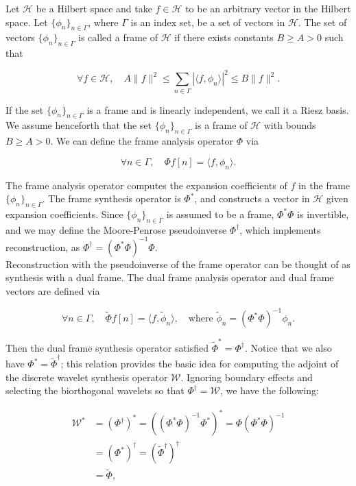 \documentclass[journal]{IEEEtran}
\begin{document}
Let $\mathcal{H}$ be a Hilbert space and take $f\in\mathcal{H}$ to be an arbitrary vector in the Hilbert space.  Let $\{\phi_n\}_{n\in\Gamma}$, where $\Gamma$ is an index set, be a set of vectors in $\mathcal{H}$.  The set of vectors $\{\phi_n\}_{n\in\Gamma}$ is called a frame of $\mathcal{H}$ if there exists constants $B\ge A > 0$ such that

\[ \forall f\in \mathcal{H}, \quad A\|f\|^2 \le \sum_{n\in\Gamma} |\langle f,\phi_n\rangle|^2\le B \|f\|^2. \] 

\noindent If the set $\{\phi_n\}_{n\in\Gamma}$ is a frame and is linearly independent, we call it a Riesz basis.\\

We assume henceforth that the set $\{\phi_n\}_{n\in\Gamma}$ is a frame of $\mathcal{H}$ with bounds $B\ge A > 0$.  We can define the frame analysis operator $\Phi$ via

\[ \forall n\in \Gamma,\quad \Phi f[n] = \langle f,\phi_n\rangle. \] 

\noindent The frame analysis operator computes the expansion coefficients of $f$ in the frame $\{\phi_n\}_{n\in\Gamma}$.  The frame synthesis operator is $\Phi^\ast$, and constructs a vector in $\mathcal{H}$ given expansion coefficients.  Since $\{\phi_n\}_{n\in\Gamma}$ is assumed to be a frame, $\Phi^\ast\Phi$ is invertible, and we may define the Moore-Penrose pseudoinverse $\Phi^\dagger$, which implements reconstruction, as $\Phi^\dagger = \left(\Phi^\ast\Phi\right)^{-1}\Phi$.\\

Reconstruction with the pseudoinverse of the frame operator can be thought of as synthesis with a dual frame.  The dual frame analysis operator and dual frame vectors are defined via

\[ \forall n\in \Gamma, \quad \tilde{\Phi}f[n] = \langle f,\tilde{\phi}_n\rangle, \quad \text{where } \tilde{\phi}_n = \left(\Phi^\ast\Phi\right)^{-1}\phi_n. \] 

\noindent Then the dual frame synthesis operator satisfied $\tilde{\Phi}^\ast = \Phi^\dagger$.  Notice that we also have $\Phi^\ast = \tilde{\Phi}^\dagger$; this relation provides the basic idea for computing the adjoint of the discrete wavelet synthesis operator $\mathcal{W}$.  Ignoring boundary effects and selecting the biorthogonal wavelets so that $\Phi^\dagger=\mathcal{W}$, we have the following:

\begin{align*}
   \mathcal{W}^\ast &= \left(\Phi^\dagger\right)^\ast = \left(\left(\Phi^\ast\Phi\right)^{-1}\Phi^\ast\right)^\ast = \Phi\left(\Phi^\ast\Phi\right)^{-1}\\ 
                    &= \left(\Phi^\ast\right)^\dagger = \left(\tilde{\Phi}^\dagger\right)^\dagger\\
                    &= \tilde{\Phi},
\end{align*}
\end{document}
